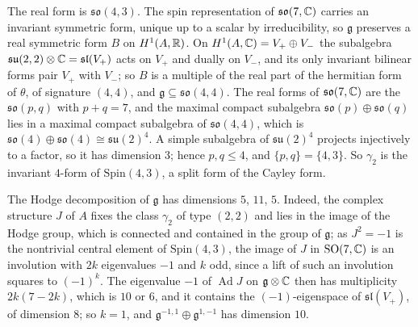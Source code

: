 \begin{remark}[The exceptional ratio at $n=2$]
The real form is $\mathfrak{so}(4,3)$. The spin representation of
$\mathfrak{so}(7,\mathbb{C})$ carries an invariant symmetric form, unique up to a
scalar by irreducibility, so $\mathfrak{g}$ preserves a real symmetric form
$B$ on $H^{1}(A,\mathbb{R})$. On $H^{1}(A,\mathbb{C})=V_{+}\oplus V_{-}$ the subalgebra
$\mathfrak{su}(2,2)\otimes\mathbb{C}=\mathfrak{sl}(V_{+})$ acts on $V_{+}$ and
dually on $V_{-}$, and its only invariant bilinear forms pair $V_{+}$ with
$V_{-}$; so $B$ is a multiple of the real part of the hermitian form of
$\theta$, of signature $(4,4)$, and $\mathfrak{g}\subseteq\mathfrak{so}(4,4)$.
The real forms of $\mathfrak{so}(7,\mathbb{C})$ are the $\mathfrak{so}(p,q)$ with
$p+q=7$, and the maximal compact subalgebra $\mathfrak{so}(p)\oplus
\mathfrak{so}(q)$ lies in a maximal compact subalgebra of
$\mathfrak{so}(4,4)$, which is $\mathfrak{so}(4)\oplus\mathfrak{so}(4)\cong
\mathfrak{su}(2)^{4}$. A simple subalgebra of $\mathfrak{su}(2)^{4}$ projects
injectively to a factor, so it has dimension $3$; hence $p,q\le4$, and
$\{p,q\}=\{4,3\}$. So $\gamma_{2}$ is the invariant $4$-form of
$\mathrm{Spin}(4,3)$, a split form of the Cayley form.

The Hodge decomposition of $\mathfrak{g}$ has dimensions $5$, $11$, $5$.
Indeed, the complex structure $J$ of $A$ fixes the class $\gamma_{2}$ of type
$(2,2)$ and lies in the image of the Hodge group, which is connected and
contained in the group of $\mathfrak{g}$; as $J^{2}=-1$ is the nontrivial
central element of $\mathrm{Spin}(4,3)$, the image of $J$ in
$\mathrm{SO}(7,\mathbb{C})$ is an involution with $2k$ eigenvalues $-1$ and $k$
odd, since a lift of such an involution squares to $(-1)^{k}$. The
eigenvalue $-1$ of $\operatorname{Ad}J$ on $\mathfrak{g}\otimes\mathbb{C}$ then has
multiplicity $2k(7-2k)$, which is $10$ or $6$, and it contains the
$(-1)$-eigenspace of $\mathfrak{sl}(V_{+})$, of dimension $8$; so $k=1$, and
$\mathfrak{g}^{-1,1}\oplus\mathfrak{g}^{1,-1}$ has dimension $10$.


\end{remark}
